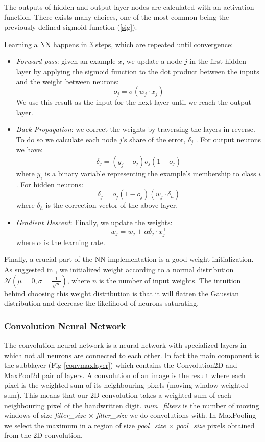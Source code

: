 \documentclass[conference]{IEEEtran}
\begin{document}
The outputs of hidden and output layer nodes are calculated with an activation function. There exists many choices, one of the most common being the previously defined sigmoid function (\ref{sig}).



Learning a NN happens in 3 steps, which are repeated until convergence:
\begin{itemize}
\item \emph{Forward pass}: given an example $x$, we update a node $j$ in the first hidden layer by applying the sigmoid function to the dot product between the inputs and the weight between neurons: $$o_j=\sigma(w_j\cdot x_j)$$ We use this result as the input for the next layer until we reach the output layer.
\item \emph{Back Propagation}: we correct the weights by traversing the layers in reverse. To do so we calculate each node $j$'s share of the error, $\delta_j$ \cite{backprop}. For output neurons we have:
$$\delta_j = (y_j-o_j)o_j  (1-o_j)$$
where $y_i$ is a binary variable representing the example's membership to class $i$. For hidden neurons:
$$\delta_j=o_j (1- o_j)\left(w_j\cdot \delta_h\right)$$
where $\delta_h$ is the correction vector of the above layer.
\item \emph{Gradient Descent}: Finally, we update the weights:
$$w_j=w_j+\alpha \delta_j\cdot x_j^{\top}$$
where $\alpha$ is the learning rate.
\end{itemize}

Finally, a crucial part of the NN implementation is a good weight initialization\cite{weights}. As suggested in \cite{nndl}, we initialized weight according to a normal distribution $\mathcal{N}\left(\mu=0,\sigma=\frac{1}{\sqrt{n}}\right)$, where $n$ is the number of input weights. The intuition behind choosing this weight distribution is that it will flatten the Gaussian distribution and decrease the likelihood of neurons saturating.

\subsubsection{Convolution Neural Network}
The convolution neural network \cite{LeCunn98} is a neural network with specialized layers in which not all neurons are connected to each other. In fact the main component is the subblayer (Fig \ref{convmaxlayer}) which contains the Convolution2D and MaxPool2d pair of layers. A convolution of an image is the result where each pixel is the weighted sum of its neighbouring pixels (moving window weighted sum). This means that our 2D convolution takes a weighted sum of each neighbouring pixel of the handwritten digit. \emph{num\_filters} is the number of moving windows of size \emph{filter\_size} $\times$ \emph{filter\_size} we do convolutions with. In MaxPooling we select the maximum in a region of size \emph{pool\_size} $\times$ \emph{pool\_size} pixels obtained from the 2D convolution.
\end{document}
